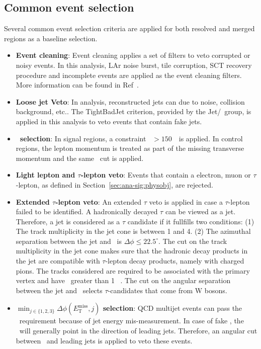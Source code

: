 \subsection{Common event selection}
\par Several common event selection criteria are applied for both resolved and merged regions as a baseline selection.
\begin{itemize}
    \item \textbf{Event cleaning}: Event cleaning applies a set of filters to veto corrupted or noisy events. In this analysis, LAr noise burst, tile corruption, SCT recovery procedure and incomplete events are applied as the event cleaning filters. More information can be found in Ref~\cite{c8-evt-cleaning}.
    \item \textbf{Loose jet Veto}: In analysis, reconstructed jets can due to noise, collision background, etc.. The TightBadJet criterion, provided by the Jet/\met~group, is applied in this analysis to veto events that contain fake jets.
    \item \textbf{\met~selection}: In signal regions, a constraint \met~$>150$~\GeV~is applied. In control regions, the lepton momentum is treated as part of the missing transverse momentum and the same \met~cut is applied.
    \item \textbf{Light lepton and $\tau$-lepton veto}: Events that contain a electron, muon or $\tau$-lepton, as defined in Section~\ref{sec:ana-sig:physobj}, are rejected.
    \item \textbf{Extended $\tau$-lepton veto}: An extended $\tau$ veto is applied in case a $\tau$-lepton failed to be identified. A hadronically decayed $\tau$ can be viewed as a jet. Therefore, a jet is considered as a $\tau$ candidate if it fullfills two conditions: (1) The track multiplicity in the jet cone is between 1 and 4. (2) The azimuthal separation between the jet and \met~is $\Delta \phi \leq 22.5^\circ$. The cut on the track multiplicity in the jet cone makes sure that the hadronic decay products in the jet are compatible with $\tau$-lepton decay products, namely with charged pions. The tracks considered are required to be associated with the primary vertex and have \pt~greater than 1 ~\GeV. The cut on the angular separation between the jet and \met~selects $\tau$-candidates that come from W bosons.
    \item \textbf{$\min_{j \in \{1,2,3\}}\Delta\phi(E_{\mathrm{T}}^{\mathrm{miss}},j)$ selection}: QCD multijet events can pass the \met~requirement because of jet energy mis-measurement. In case of fake \met, the \met~will generally point in the direction of leading jets. Therefore, an angular cut between \met~and leading jets is applied to veto these events.
\end{itemize}

